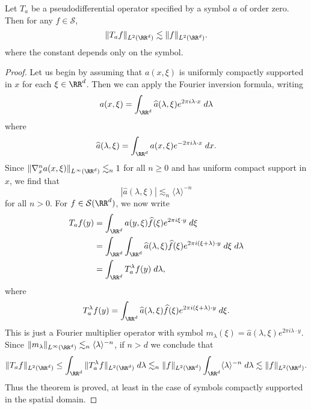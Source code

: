 \begin{theorem}
    Let $T_a$ be a pseudodifferential operator specified by a symbol $a$ of order zero. Then for any $f \in \mathcal{S}$,
    \[ \| T_af \|_{L^2(\RR^d)} \lesssim \| f \|_{L^2(\RR^d)}. \] 
    where the constant depends only on the symbol.
\end{theorem}
\begin{proof}
    Let us begin by assuming that $a(x,\xi)$ is uniformly compactly supported in $x$ for each $\xi \in \RR^d$. Then we can apply the Fourier inversion formula, writing
    \[ a(x,\xi) = \int_{\RR^d} \widehat{a}(\lambda,\xi) e^{2 \pi i \lambda \cdot x}\; d\lambda \]
    where
    \[ \widehat{a}(\lambda,\xi) = \int_{\RR^d} a(x,\xi) e^{- 2 \pi i \lambda \cdot x}\; dx. \]
    Since $\| \nabla^n_x a(x,\xi) \|_{L^\infty(\RR^d)} \lesssim_n 1$ for all $n \geq 0$ and has uniform compact support in $x$, we find that
    \[ |\widehat{a}(\lambda,\xi)| \lesssim_n \langle \lambda \rangle^{-n} \]
    for all $n > 0$. For $f \in \mathcal{S}(\RR^d)$, we now write
    \begin{align*}
        T_af(y) &= \int_{\RR^d} a(y,\xi) \widehat{f}(\xi) e^{2 \pi i \xi \cdot y}\; d\xi\\
        &= \int_{\RR^d} \int_{\RR^d} \widehat{a}(\lambda,\xi) \widehat{f}(\xi) e^{2 \pi i (\xi + \lambda) \cdot y}\; d\xi\; d\lambda\\
        &= \int_{\RR^d} T_a^\lambda f(y)\; d\lambda,
    \end{align*}
    where
    \[ T_a^\lambda f(y) = \int_{\RR^d} \widehat{a}(\lambda,\xi) \widehat{f}(\xi) e^{2 \pi i (\xi + \lambda) \cdot y}\; d\xi. \]
    This is just a Fourier multiplier operator with symbol $m_\lambda(\xi) = \widehat{a}(\lambda,\xi) e^{2 \pi i \lambda \cdot y}$. Since $\| m_\lambda \|_{L^\infty(\RR^d)} \lesssim_n \langle \lambda \rangle^{-n}$, if $n > d$ we conclude that
    \[ \| T_af \|_{L^2(\RR^d)} \leq \int_{\RR^d} \| T_a^\lambda f \|_{L^2(\RR^d)}\; d\lambda \lesssim_n \| f \|_{L^2(\RR^d)} \int_{\RR^d} \langle \lambda \rangle^{-n}\; d\lambda \lesssim \| f \|_{L^2(\RR^d)}. \]
    Thus the theorem is proved, at least in the case of symbols compactly supported in the spatial domain.


\end{proof}
